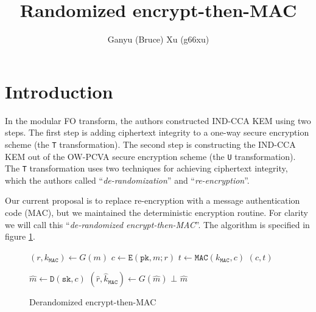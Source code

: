 \documentclass{article}
\title{Randomized encrypt-then-MAC}
\author{Ganyu (Bruce) Xu (g66xu)}
\newcommand{\monospace}{\texttt}
\newcommand{\encrypt}{\monospace{E}}
\newcommand{\decrypt}{\monospace{D}}
\newcommand{\etm}{\monospace{EtM}}  %
\newcommand{\mac}{\monospace{MAC}}
\newcommand{\sign}{\monospace{MAC}}
\newcommand{\verify}{\monospace{MAC.Verify}}
\newcommand{\pk}{\monospace{pk}}
\newcommand{\sk}{\monospace{sk}}
\newlength{\wdth}
\newcommand{\strike}[1]{\settowidth{\wdth}{#1}\rlap{\rule[.5ex]{\wdth}{.4pt}}#1}
\newcommand{\notrand}{{\strike{\$}}}
\begin{document}
\maketitle

\section{Introduction}
In the modular FO transform\cite{hofheinz2017modular}, the authors constructed IND-CCA KEM using two steps. The first step is adding ciphertext integrity to a one-way secure encryption scheme (the \monospace{T} transformation). The second step is constructing the IND-CCA KEM out of the OW-PCVA secure encryption scheme (the \monospace{U} transformation). The \monospace{T} transformation uses two techniques for achieving ciphertext integrity, which the authors called ``\emph{de-randomization}'' and ``\emph{re-encryption}''.

Our current proposal is to replace re-encryption with a message authentication code (MAC), but we maintained the deterministic encryption routine. For clarity we will call this ``\emph{de-randomized encrypt-then-MAC}''. The algorithm is specified in figure \ref{fig:derand-etm}.

\begin{figure}[h]
  \begin{minipage}{.49\textwidth}  %
    \begin{algorithm}[H]
      \caption{$\encrypt^\notrand_\etm(\pk, m)$}
      \begin{algorithmic}[1]
        \State $(r, k_\mac) \leftarrow G(m)$
        \State $c \leftarrow \encrypt(\pk, m; r)$
        \State $t \leftarrow \sign(k_\mac, c)$
        \State \Return $(c, t)$
      \end{algorithmic}
    \end{algorithm}
  \end{minipage}
  \hfill  %
  \begin{minipage}{.49\textwidth}  %
    \begin{algorithm}[H]
      \caption{$\decrypt^\notrand_\etm(\sk, (c, t))$}
      \begin{algorithmic}[1]
        \State $\hat{m} \leftarrow \decrypt(\sk, c)$
        \State $(\hat{r}, \hat{k}_\mac) \leftarrow G(\hat{m})$
        \If{$\verify(\hat{k}_\mac, c, t) \neq 1$}
          \State \Return $\bot$
        \EndIf
        \State \Return $\hat{m}$
      \end{algorithmic}
    \end{algorithm}
  \end{minipage}
  \caption{Derandomized encrypt-then-MAC}\label{fig:derand-etm}
\end{figure}
\end{document}
